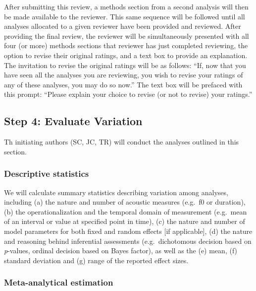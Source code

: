 \documentclass[
  english,
  man,floatsintext]{apa6}
\begin{document}
After submitting this review, a methods section from a second analysis will then be made available to the reviewer.
This same sequence will be followed until all analyses allocated to a given reviewer have been provided and reviewed.
After providing the final review, the reviewer will be simultaneously presented with all four (or more) methods sections that reviewer has just completed reviewing, the option to revise their original ratings, and a text box to provide an explanation.
The invitation to revise the original ratings will be as follows: ``If, now that you have seen all the analyses you are reviewing, you wish to revise your ratings of any of these analyses, you may do so now.''
The text box will be prefaced with this prompt: ``Please explain your choice to revise (or not to revise) your ratings.''

\hypertarget{step-4-evaluate-variation}{%
\subsection{Step 4: Evaluate Variation}\label{step-4-evaluate-variation}}

Th initiating authors (SC, JC, TR) will conduct the analyses outlined in this section.

\hypertarget{descriptive-statistics}{%
\subsubsection{Descriptive statistics}\label{descriptive-statistics}}

We will calculate summary statistics describing variation among analyses, including (a) the nature and number of acoustic measures (e.g.~f0 or duration), (b) the operationalization and the temporal domain of measurement (e.g.~mean of an interval or value at specified point in time), (c) the nature and number of model parameters for both fixed and random effects {[}if applicable{]}, (d) the nature and reasoning behind inferential assessments (e.g.~dichotomous decision based on \emph{p}-values, ordinal decision based on Bayes factor), as well as the (e) mean, (f) standard deviation and (g) range of the reported effect sizes.

\hypertarget{s:meta-est}{%
\subsubsection{Meta-analytical estimation}\label{s:meta-est}}
\end{document}
